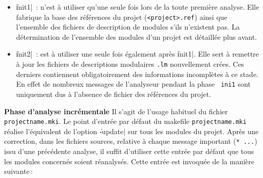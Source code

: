 \begin{itemize}
\begin{itemize}
\item \|init1| \,: n'est \`{a} utiliser qu'une seule fois lors de la
toute premi\`{e}re analyse. Elle fabrique la base des r\'{e}f\'{e}rences du
projet ({\tt <project>.ref}) ainsi que l'ensemble des fichiers de
description de modules s'ils n'existent pas. La d\'{e}termination de
l'ensemble des modules d'un projet est d\'{e}taill\'{e}e plus avant.

\item \|init2| \,: est \`{a} utiliser une seule fois \'{e}galement apr\`{e}s
\|init1|. Elle sert \`{a} remettre \`{a} jour les fichiers de descriptions
modulaires {\tt *.lm} nouvellement cr\'{e}es. Ces derniers contiennent
obligatoirement  des informations incompl\`{e}tes \`{a} ce stade.
En effet de nombreux messages de l'analyseur pendant la phase {\tt
ini1} sont uniquement dus \`{a} l'absence de fichier des r\'{e}f\'{e}rences du
projet. 
\end{itemize}

\begin{Side}{\bf Phase d'analyse incr\'{e}mentale}
Il s'agit de l'usage habituel du fichier {\tt projectname.mki}. 
Le point d'entr\'{e}e par d\'{e}faut du makefile {\tt projectname.mki}
r\'{e}alise l'\'{e}quivalent de l'option \|-update| sur tous les modules du
projet. Apr\`{e}s une correction, dans les fichiers sources, relative \`{a}
chaque message important ({\tt ** ...}) issu d'une pr\'{e}c\'{e}dente
analyse, il suffit d'utiliser cette entr\'{e}e par d\'{e}faut que tous les modules
concern\'{e}s soient r\'{e}analys\'{e}s.  Cette entr\'{e}e est invoqu\'{e}e de la
mani\`{e}re suivante\,:
\BeginLL
\EndLL
\end{Side}


\end{itemize}
